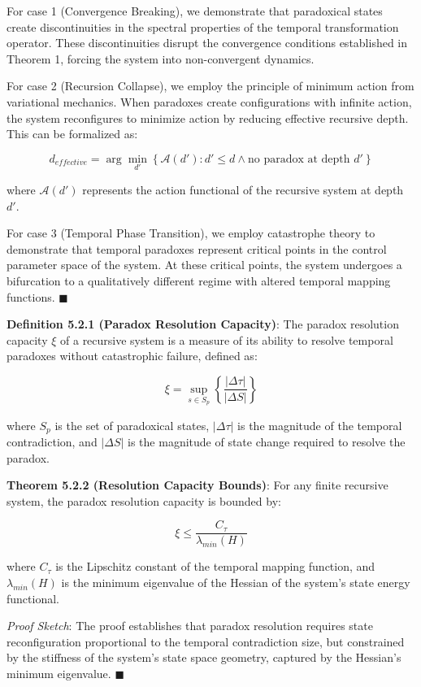 \documentclass[
]{article}
\begin{document}
For case 1 (Convergence Breaking), we demonstrate that paradoxical
states create discontinuities in the spectral properties of the temporal
transformation operator. These discontinuities disrupt the convergence
conditions established in Theorem 1, forcing the system into
non-convergent dynamics.

For case 2 (Recursion Collapse), we employ the principle of minimum
action from variational mechanics. When paradoxes create configurations
with infinite action, the system reconfigures to minimize action by
reducing effective recursive depth. This can be formalized as:

\[d_{effective} = \arg\min_{d'} \left\{\mathcal{A}(d') : d' \leq d \land \text{no paradox at depth } d'\right\}\]

where \(\mathcal{A}(d')\) represents the action functional of the
recursive system at depth \(d'\).

For case 3 (Temporal Phase Transition), we employ catastrophe theory to
demonstrate that temporal paradoxes represent critical points in the
control parameter space of the system. At these critical points, the
system undergoes a bifurcation to a qualitatively different regime with
altered temporal mapping functions. \(\blacksquare \)

\textbf{Definition 5.2.1 (Paradox Resolution Capacity)}: The paradox
resolution capacity \(\xi\) of a recursive system is a measure of its
ability to resolve temporal paradoxes without catastrophic failure,
defined as:

\[\xi = \sup_{s \in S_p} \left\{\frac{|\Delta \tau|}{|\Delta S|}\right\}\]

where \(S_p\) is the set of paradoxical states, \(|\Delta \tau|\) is the
magnitude of the temporal contradiction, and \(|\Delta S|\) is the
magnitude of state change required to resolve the paradox.

\textbf{Theorem 5.2.2 (Resolution Capacity Bounds)}: For any finite
recursive system, the paradox resolution capacity is bounded by:

\[\xi \leq \frac{C_{\tau}}{\lambda_{min}(H)}\]

where \(C_{\tau}\) is the Lipschitz constant of the temporal mapping
function, and \(\lambda_{min}(H)\) is the minimum eigenvalue of the
Hessian of the system's state energy functional.

\emph{Proof Sketch}: The proof establishes that paradox resolution
requires state reconfiguration proportional to the temporal
contradiction size, but constrained by the stiffness of the system's
state space geometry, captured by the Hessian's minimum eigenvalue.
\(\blacksquare \)
\end{document}

